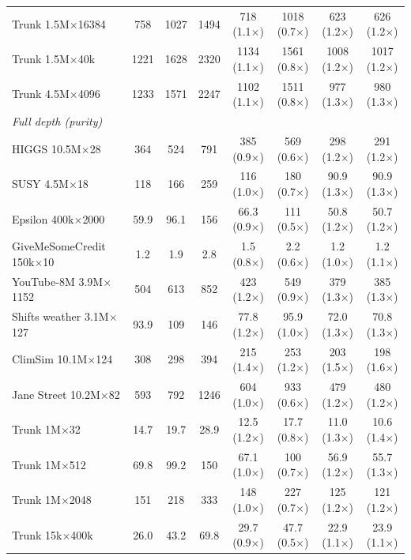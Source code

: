 \begin{table}[p]
\begin{tabular}{l|ccc|cccc}
        Trunk 1.5M$\times$16384 & 758 & 1027 & 1494 & 718 (1.1$\times$) & 1018 (0.7$\times$) & 623 (1.2$\times$) & 626 (1.2$\times$) \\
        Trunk 1.5M$\times$40k & 1221 & 1628 & 2320 & 1134 (1.1$\times$) & 1561 (0.8$\times$) & 1008 (1.2$\times$) & 1017 (1.2$\times$) \\
        Trunk 4.5M$\times$4096 & 1233 & 1571 & 2247 & 1102 (1.1$\times$) & 1511 (0.8$\times$) & 977 (1.3$\times$) & 980 (1.3$\times$) \\
        \hline
        \multicolumn{8}{l}{\textit{Full depth (purity)}} \\
        HIGGS 10.5M$\times$28 & 364 & 524 & 791 & 385 (0.9$\times$) & 569 (0.6$\times$) & 298 (1.2$\times$) & 291 (1.2$\times$) \\
        SUSY 4.5M$\times$18 & 118 & 166 & 259 & 116 (1.0$\times$) & 180 (0.7$\times$) & 90.9 (1.3$\times$) & 90.9 (1.3$\times$) \\
        Epsilon 400k$\times$2000 & 59.9 & 96.1 & 156 & 66.3 (0.9$\times$) & 111 (0.5$\times$) & 50.8 (1.2$\times$) & 50.7 (1.2$\times$) \\
        GiveMeSomeCredit 150k$\times$10 & 1.2 & 1.9 & 2.8 & 1.5 (0.8$\times$) & 2.2 (0.6$\times$) & 1.2 (1.0$\times$) & 1.2 (1.1$\times$) \\
        YouTube-8M 3.9M$\times$1152 & 504 & 613 & 852 & 423 (1.2$\times$) & 549 (0.9$\times$) & 379 (1.3$\times$) & 385 (1.3$\times$) \\
        Shifts weather 3.1M$\times$127 & 93.9 & 109 & 146 & 77.8 (1.2$\times$) & 95.9 (1.0$\times$) & 72.0 (1.3$\times$) & 70.8 (1.3$\times$) \\
        ClimSim 10.1M$\times$124 & 308 & 298 & 394 & 215 (1.4$\times$) & 253 (1.2$\times$) & 203 (1.5$\times$) & 198 (1.6$\times$) \\
        Jane Street 10.2M$\times$82 & 593 & 792 & 1246 & 604 (1.0$\times$) & 933 (0.6$\times$) & 479 (1.2$\times$) & 480 (1.2$\times$) \\
        Trunk 1M$\times$32 & 14.7 & 19.7 & 28.9 & 12.5 (1.2$\times$) & 17.7 (0.8$\times$) & 11.0 (1.3$\times$) & 10.6 (1.4$\times$) \\
        Trunk 1M$\times$512 & 69.8 & 99.2 & 150 & 67.1 (1.0$\times$) & 100 (0.7$\times$) & 56.9 (1.2$\times$) & 55.7 (1.3$\times$) \\
        Trunk 1M$\times$2048 & 151 & 218 & 333 & 148 (1.0$\times$) & 227 (0.7$\times$) & 125 (1.2$\times$) & 121 (1.2$\times$) \\
        Trunk 15k$\times$400k & 26.0 & 43.2 & 69.8 & 29.7 (0.9$\times$) & 47.7 (0.5$\times$) & 22.9 (1.1$\times$) & 23.9 (1.1$\times$) \\

\end{tabular}
\end{table}
